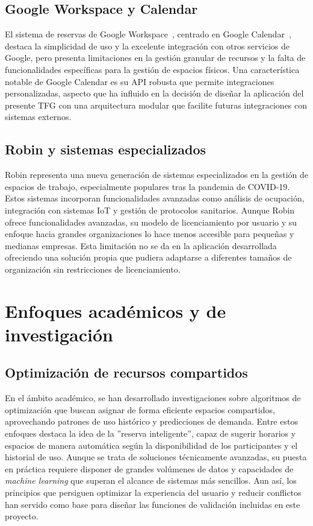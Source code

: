 \subsection{Google Workspace y Calendar}\label{google-workspace-calendar}
El sistema de reservas de Google Workspace~\cite{google-workspace}, centrado en Google Calendar~\cite{google-calendar}, destaca la simplicidad de uso y la excelente integración con otros servicios de Google, pero presenta limitaciones en la gestión granular de recursos y la falta de funcionalidades específicas para la gestión de espacios físicos.
Una característica notable de Google Calendar es su API robusta que permite integraciones personalizadas, aspecto que ha influido en la decisión de diseñar la aplicación del presente TFG con una arquitectura modular que facilite futuras integraciones con sistemas externos.\\

\subsection{Robin y sistemas especializados}\label{robin-sistemas-especializados}
Robin representa una nueva generación de sistemas especializados en la gestión de espacios de trabajo, especialmente populares tras la pandemia de COVID-19. Estos sistemas incorporan funcionalidades avanzadas como análisis de ocupación, integración con sistemas IoT y gestión de protocolos sanitarios.
Aunque Robin ofrece funcionalidades avanzadas, su modelo de licenciamiento por usuario y su enfoque hacia grandes organizaciones lo hace menos accesible para pequeñas y medianas empresas. Esta limitación no se da en la aplicación desarrollada ofreciendo una solución propia que pudiera adaptarse a diferentes tamaños de organización sin restricciones de licenciamiento.\\

\section{Enfoques académicos y de investigación}\label{enfoques-academicos-investigacion}
\subsection{Optimización de recursos compartidos}\label{optimizacion-recursos-compartidos}
En el ámbito académico, se han desarrollado investigaciones sobre algoritmos de optimización que buscan asignar de forma eficiente espacios compartidos, aprovechando patrones de uso histórico y predicciones de demanda. Entre estos enfoques destaca la idea de la ''reserva inteligente'', capaz de sugerir horarios y espacios de manera automática según la disponibilidad de los participantes y el historial de uso.
Aunque se trata de soluciones técnicamente avanzadas, su puesta en práctica requiere disponer de grandes volúmenes de datos y capacidades de \emph{machine learning} que superan el alcance de sistemas más sencillos. Aun así, los principios que persiguen optimizar la experiencia del usuario y reducir conflictos han servido como base para diseñar las funciones de validación incluidas en este proyecto.\\

